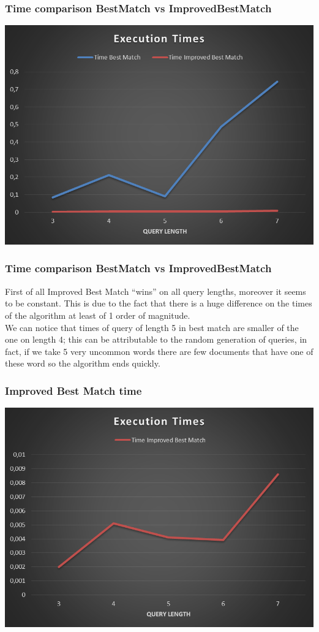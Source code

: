 \documentclass{beamer}
\begin{document}
\begin{frame}
	\frametitle{Time comparison BestMatch vs ImprovedBestMatch}
	\begin{center}
	\includegraphics[scale=0.32]{img/Matching/Tempi.PNG} 
	\end{center}
\end{frame}

\begin{frame}
\frametitle{Time comparison BestMatch vs ImprovedBestMatch}
First of all  Improved Best Match ``\alert{wins}'' on all query lengths, moreover it seems to be constant. This is due to the fact that there is a huge difference on the times of the algorithm at least of 1 order of magnitude.\\
\medskip
We can notice that times of query of length 5 in best match are smaller of the one on length 4; this can be attributable to the random generation of queries, in fact, if we take 5 very uncommon words there are \alert{few} documents that have one of these word so the algorithm ends quickly. 
\end{frame}

\begin{frame}
\frametitle{Improved Best Match time}
\begin{center}
\includegraphics[scale=0.32]{img/Matching/Tempi_IMP.PNG} 
\end{center}
\end{frame}
\end{document}
